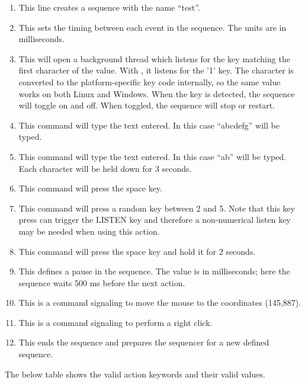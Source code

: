 \begin{enumerate}
	\item {} This line creates a sequence with the name ``test''.
	\item {} This sets the timing between each event in the sequence. The units are in milliseconds.
	\item {} This will open a background thread which listens for the key matching the first character of the value. With , it listens for the '1' key. The character is converted to the platform-specific key code internally, so the same value works on both Linux and Windows. When the key is detected, the sequence will toggle on and off. When toggled, the sequence will stop or restart.
	\item {} This command will type the text entered. In this case ``abcdefg'' will be typed.
	\item {} This command will type the text entered. In this case ``ab'' will be typed. Each character will be held down for 3 seconds.
	\item {} This command will press the space key.
	\item {} This command will press a random key between 2 and 5. Note that this key press can trigger the LISTEN key and therefore a non-numerical listen key may be needed when using this action.
	\item {} This command will press the space key and hold it for 2 seconds.
	\item {} This defines a pause in the sequence. The value is in milliseconds; here the sequence waits 500 ms before the next action.
	\item {} This is a command signaling to move the mouse to the coordinates (145,887).
	\item {} This is a command signaling to perform a right click.
	\item {} This ends the sequence and prepares the sequencer for a new defined sequence.
\end{enumerate}

The below table shows the valid action keywords and their valid values.

